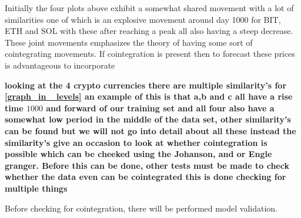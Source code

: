 Initially the four plots above exhibit a somewhat shared movement with a lot of similarities one of which is an explosive movement around day 1000 for BIT, ETH and SOL with these after reaching a peak all also having a steep decrease. These joint movements emphasizes the theory of having some sort of cointegrating movements. If cointegration is present then to forecast these prices is advantageous to incorporate 

\noindent \textbf{looking at the 4 crypto currencies there are multiple similarity's for \ref{graph_in _levels} an example of this is that a,b and c all have a rise time $1000$ and forward of our training set and all four also have a somewhat low period in the middle of the data set, other similarity's can be found but we will not go into detail about all these instead the similarity's give an occasion to look at whether cointegration is possible which can be cheeked using the Johanson, and or Engle granger. Before this can be done, other tests must be made to check whether the data even can be cointegrated this is done checking for multiple things}



Before checking for cointegration, there will be performed model validation.


